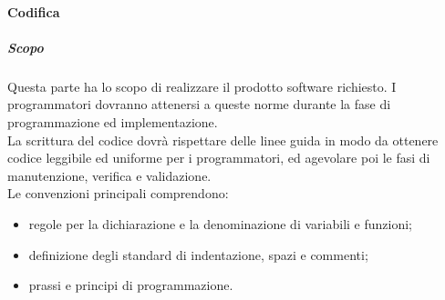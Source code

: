 			\paragraph{Codifica}
			\subparagraph{Scopo}
			Questa parte ha lo scopo di realizzare il prodotto software richiesto. I programmatori dovranno attenersi a queste norme durante la fase di programmazione ed implementazione.
			\\
			La scrittura del codice dovrà rispettare delle linee guida in modo da ottenere codice leggibile ed uniforme per i programmatori, ed agevolare poi le fasi di manutenzione, verifica e validazione. \\
			Le convenzioni principali comprendono:
			\begin{itemize}
				\item regole per la dichiarazione e la denominazione di variabili e funzioni;
				\item definizione degli standard di indentazione, spazi e commenti;
				\item prassi e principi di programmazione.
			\end{itemize}
		
